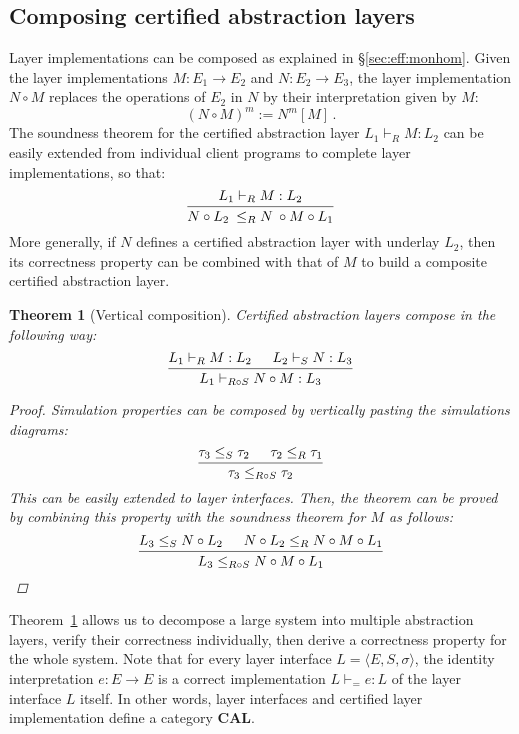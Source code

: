\documentclass[11pt,oneside]{book}
\newtheorem{theorem}{Theorem}[chapter]
\theoremstyle{definition}
\begin{document}

\subsection{Composing certified abstraction layers} %

Layer implementations can be composed
as explained in \S\ref{sec:eff:monhom}.
Given the layer implementations
$M : E_1 \rightarrow E_2$ and $N : E_2 \rightarrow E_3$,
the layer implementation $N \circ M$
replaces the operations of $E_2$ in $N$
by their interpretation given by $M$:
\[
  (N \circ M)^m := N^m[M]
  \,.
\]
The soundness theorem for the certified abstraction layer
$L_1 \vdash_R M : L_2$
can be easily extended from individual client programs
to complete layer implementations,
so that:
\[
  \begin{prooftree}
    \hypo{L_1 \vdash_R M : L_2}
    \infer1{N \circ L_2 \: \le_R N \: \circ M \circ L_1}
  \end{prooftree}
\]
More generally,
if $N$ defines a certified abstraction layer
with underlay $L_2$,
then its correctness property can be combined with that of $M$
to build a composite certified abstraction layer.

\begin{theorem}[Vertical composition] \label{thm:vcomp} %
Certified abstraction layers compose in the following way:
\[
  \begin{prooftree}
    \hypo{L_1 \vdash_R M : L_2}
    \hypo{L_2 \vdash_S N : L_3}
    \infer2{L_1 \vdash_{R \circ S} N \circ M : L_3}
  \end{prooftree}
\]
\begin{proof}
Simulation properties can be composed
by vertically pasting the simulations diagrams:
\[
  \begin{prooftree}
    \hypo{\tau_3 \le_S \tau_2}
    \hypo{\tau_2 \le_R \tau_1}
    \infer2{\tau_3 \le_{R \circ S} \tau_2}
  \end{prooftree}
\]
This can be easily extended to layer interfaces.
Then,
the theorem can be proved by
combining this property with the soundness theorem for $M$
as follows:
\[
  \begin{prooftree}
    \hypo{L_3 \le_S N \circ L_2}
    \hypo{N \circ L_2 \le_R N \circ M \circ L_1}
    \infer2{L_3 \le_{R \circ S} N \circ M \circ L_1}
  \end{prooftree}
\]
\end{proof}
\end{theorem}

Theorem~\ref{thm:vcomp} allows us to decompose a large system
into multiple abstraction layers,
verify their correctness individually,
then derive a correctness property for the whole system.
Note that for every layer interface
$L = \langle E, S, \sigma \rangle$,
the identity interpretation $e : E \rightarrow E$
is a correct implementation $L \vdash_{=} e : L$
of the layer interface $L$ itself.
In other words,
layer interfaces and certified layer implementation
define a category $\mathbf{CAL}$.
\end{document}
